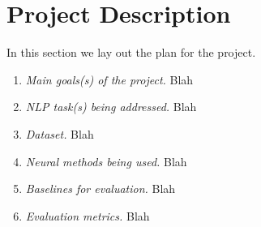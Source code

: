 \section{Project Description}
\label{sec:projectdescription}

In this section we lay out the plan for the project.

\begin{enumerate}
\item \textit{Main goals(s) of the project.} Blah
\item \textit{NLP task(s) being addressed.} Blah
\item \textit{Dataset.} Blah
\item \textit{Neural methods being used.} Blah
\item \textit{Baselines for evaluation.} Blah
\item \textit{Evaluation metrics.} Blah
\end{enumerate}